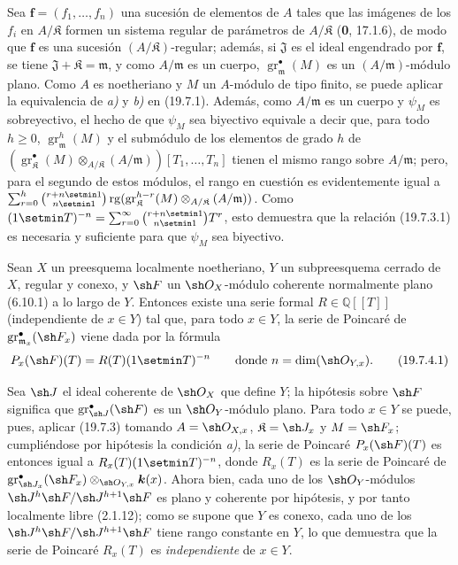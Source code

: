 Sea $\mathbf f=(f_1,\ldots,f_n)$ una sucesión de elementos de $A$ tales que las imágenes de los $f_i$ en $A/\mathfrak K$ formen un sistema regular de parámetros de $A/\mathfrak K$ (\textbf{0}, 17.1.6), de modo que $\mathbf f$ es una sucesión $(A/\mathfrak K)$-regular; además, si $\mathfrak J$ es el ideal engendrado por $\mathbf f$, se tiene $\mathfrak J+\mathfrak K=\mathfrak m$, y como $A/\mathfrak m$ es un cuerpo, $\operatorname{gr}_{\mathfrak m}^\bullet(M)$ es un $(A/\mathfrak m)$-módulo plano. Como $A$ es noetheriano y $M$ un $A$-módulo de tipo finito, se puede aplicar la equivalencia de \emph{a)} y \emph{b)} en (19.7.1). Además, como $A/\mathfrak m$ es un cuerpo y $\psi_M$ es sobreyectivo, el hecho de que $\psi_M$ sea biyectivo equivale a decir que, para todo $h\geq0$, $\operatorname{gr}_{\mathfrak m}^h(M)$ y el submódulo de los elementos de grado $h$ de $(\operatorname{gr}_{\mathfrak K}^\bullet(M)\otimes_{A/\mathfrak K}(A/\mathfrak m))[T_1,\ldots,T_n]$ tienen el mismo rango sobre $A/\mathfrak m$; pero, para el segundo de estos módulos, el rango en cuestión es evidentemente igual a
$\sum_{r=0}^h\binom{r+n\setmin 1}{n\setmin 1}\operatorname{rg}(\operatorname{gr}_{\mathfrak K}^{h-r}(M)\otimes_{A/\mathfrak K}(A/\mathfrak m))$.
Como
$(1\setmin T)^{-n}=\sum_{r=0}^{\infty}\binom{r+n\setmin 1}{n\setmin 1}T^r$,
esto demuestra que la relación (19.7.3.1) es necesaria y suficiente para que $\psi_M$ sea biyectivo.

\begin{corollary}[19.7.4]
\label{IV.19.7.4}
Sean $X$ un preesquema localmente noetheriano, $Y$ un subpreesquema cerrado de $X$, regular y conexo, y $\sh F$ un $\sh O_X$-módulo coherente normalmente plano \textup{(6.10.1)} a lo largo de $Y$. Entonces existe una serie formal $R\in\mathbb{Q}[[T]]$ \textup{(independiente de $x\in Y$)} tal que, para todo $x\in Y$, la serie de Poincaré de $\operatorname{gr}_{\mathfrak m_x}^\bullet(\sh F_x)$ viene dada por la fórmula
\begin{equation}
  P_x(\sh F)(T)=R(T)(1\setmin T)^{-n}\qquad\text{donde }n=\dim(\sh O_{Y,x}).
  \tag{19.7.4.1}\label{IV.19.7.4.1}
\end{equation}
\end{corollary}


Sea $\sh J$ el ideal coherente de $\sh O_X$ que define $Y$; la hipótesis sobre $\sh F$ significa que $\operatorname{gr}_{\sh J}^\bullet(\sh F)$ es un $\sh O_Y$-módulo plano. Para todo $x\in Y$ se puede, pues, aplicar (19.7.3) tomando $A=\sh O_{X,x}$, $\mathfrak K=\sh J_x$ y $M=\sh F_x$; cumpliéndose por hipótesis la condición \emph{a)}, la serie de Poincaré $P_x(\sh F)(T)$ es entonces igual a $R_x(T)(1\setmin T)^{-n}$, donde $R_x(T)$ es la serie de Poincaré de $\operatorname{gr}_{\sh J_x}^\bullet(\sh F_x)\otimes_{\sh O_{Y,x}}\boldsymbol{k}(x)$. Ahora bien, cada uno de los $\sh O_Y$-módulos $\sh J^h\sh F/\sh J^{h+1}\sh F$ es plano y coherente por hipótesis, y por tanto localmente libre (2.1.12); como se supone que $Y$ es conexo, cada uno de los $\sh J^h\sh F/\sh J^{h+1}\sh F$ tiene rango constante en $Y$, lo que demuestra que la serie de Poincaré $R_x(T)$ es \emph{independiente} de $x\in Y$.

